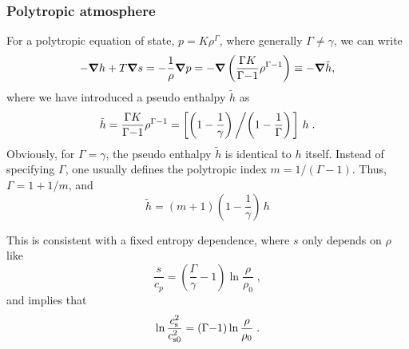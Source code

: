 \documentclass[\mydriver,12pt,twoside,notitlepage,a4paper]{article}
\renewcommand{\vec}[1]{\mbox{\boldmath{$#1$}}}
\newcommand{\grad}    {\vec{\nabla}}
\begin{document}
\subsubsection{Polytropic atmosphere}

For a polytropic equation of state, $p=K\rho^\Gamma$, where generally
$\Gamma\neq\gamma$, we can write
\begin{equation}
  -\grad h+T\grad s
  = -\frac{1}{\rho}\grad p
  = -\grad\left(\frac{\Gamma K}{\Gamma{-}1}\rho^{\Gamma{-}1}\right)
\equiv-\grad\tilde{h},
\end{equation}
where we have introduced a pseudo enthalpy $\tilde{h}$ as
\begin{equation}
  \tilde{h} = \frac{\Gamma K}{\Gamma{-}1}\rho^{\Gamma{-}1}
  =\left[\left(1-\frac{1}{\gamma}\right)
    \left/\left(1-\frac{1}{\Gamma}\right)\right.\right]\,h\; .
\end{equation}
Obviously, for $\Gamma=\gamma$, the pseudo enthalpy $\tilde{h}$ is
identical to $h$ itself.
Instead of specifying $\Gamma$, one usually defines the polytropic
index $m=1/(\Gamma{-}1)$. Thus, $\Gamma=1+1/m$, and
\begin{equation}\label{hhtilde}
  \tilde{h}=(m{+}1)\left(1-\frac{1}{\gamma}\right)\,h
\end{equation}

This is consistent with a fixed entropy dependence,
where $s$ only depends on $\rho$ like
\begin{equation}
  \frac{s}{c_p} = \left( \frac{\Gamma}{\gamma} - 1 \right)
                        \ln\frac{\rho}{\rho_0} \; ,
\end{equation}
and implies that
\begin{equation}
  \ln \frac{c_{\rm s}^2}{c_{\rm s0}^2}
  = (\Gamma{-}1) \ln\frac{\rho}{\rho_0} \; .
\end{equation}
\end{document}
